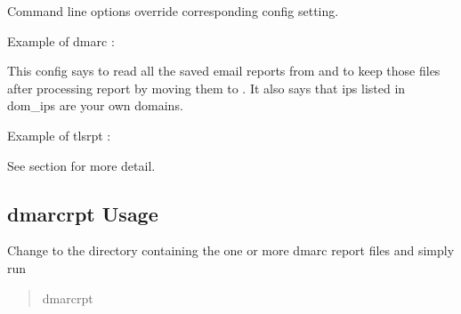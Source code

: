 \documentclass[letterpaper,10pt,english]{sphinxmanual}
\begin{document}
\sphinxAtStartPar
Command line options override corresponding config setting.

\sphinxAtStartPar
Example of dmarc :

\begin{sphinxVerbatim}[commandchars=\\\{\}]
  
  
  
  \PYG{p}{[} \PYG{p}{]}
\end{sphinxVerbatim}

\sphinxAtStartPar
This config says to read all the saved email reports from 
and to keep those files after processing report by moving them to .
It also says that ips listed in dom\_ips are your own domains.

\sphinxAtStartPar
Example of tls\sphinxhyphen{}rpt :

\begin{sphinxVerbatim}[commandchars=\\\{\}]
  
  
  
\end{sphinxVerbatim}

\sphinxAtStartPar
See  section for more detail.


\subsection{dmarc\sphinxhyphen{}rpt Usage}
\label{\detokenize{README:dmarc-rpt-usage}}
\sphinxAtStartPar
Change to the directory containing the one or more dmarc report files and simply run
\begin{quote}

\begin{sphinxVerbatim}[commandchars=\\\{\}]
dmarc\PYGZhy{}rpt
\end{sphinxVerbatim}
\end{quote}
\end{document}
